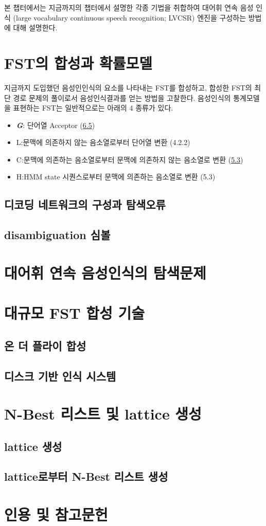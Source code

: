 \documentclass[../main.tex]{subfiles}
\begin{document}
\noindent
본 챕터에서는 지금까지의 챕터에서 설명한 각종 기법을 취합하여 대어휘 연속 음성 인식 (large vocabulary continuous speech recognition; LVCSR) 엔진을 구성하는 방법에 대해 설명한다. 

\section{FST의 합성과 확률모델}
지금까지 도입했던 음성인인식의 요소를 나타내는 FST를 합성하고, 합성한 FST의 최단 경로 문제의 풀이로서 음성인식결과를 얻는 방법을 고찰한다. 음성인식의 통계모델을 표현하는 FST는 일반적으로는 아래의 4 종류가 있다. 

\begin{itemize}
    \item \textit{\textbf{G}}: 단어열 Acceptor (\hyperref[sec:N-gram-FST]{6.5})
    \item L:문맥에 의존하지 않는 음소열로부터 단어열 변환 (4.2.2)
    \item C:문맥에 의존하는 음소열로부터 문맥에 의존하지 않는 음소열로 변환 (\hyperref[sec:context-dependant-model]{5.3})
    \item H:HMM state 시퀀스로부터 문맥에 의존하는 음소열로 변환 (5.3)
\end{itemize}

\subsection{디코딩 네트워크의 구성과 탐색오류}
\subsection{disambiguation 심볼}

\section{대어휘 연속 음성인식의 탐색문제}
\section{대규모 FST 합성 기술}
\subsection{온 더 플라이 합성}
\subsection{디스크 기반 인식 시스템}

\section{N-Best 리스트 및 lattice 생성}
\subsection{lattice 생성}
\subsection{lattice로부터 N-Best 리스트 생성}

\section*{인용 및 참고문헌}
\end{document}
